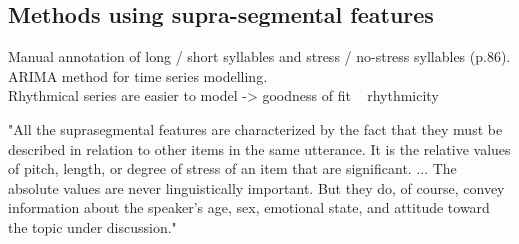 


\subsection{Methods using supra-segmental features}
Manual annotation of long / short syllables and stress / no-stress syllables (p.86).
ARIMA method for time series modelling.\\
Rhythmical series are easier to model -> goodness of fit ~ rhythmicity


"All the suprasegmental features are characterized by the fact that they must be described in relation to other items in the same utterance.
It is the relative values of pitch, length, or degree of stress of an item that are significant.
... The absolute values are never linguistically important.
But they do, of course, convey information about the speaker's age, sex, emotional state, and attitude toward the topic under discussion."\cite{ladefoged2014courseInPhonetics}

